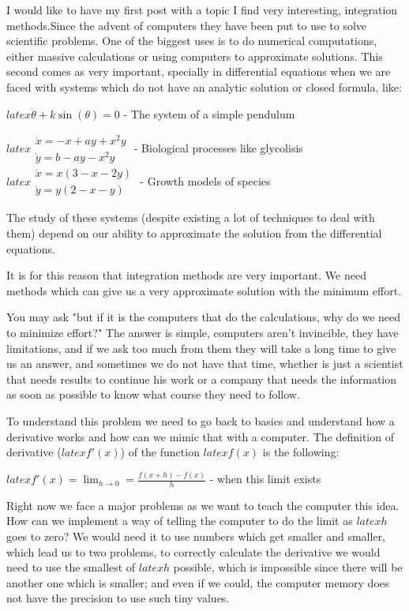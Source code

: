 I would like to have my first post with a topic I find very interesting, integration methods.Since the advent of computers they have been put to use to solve scientific problems. One of the biggest uses is to do numerical computations, either massive calculations or using computers to approximate solutions. This second comes as very important, specially in differential equations when we are faced with systems which do not have an analytic solution or closed formula, like:

    $latex \ddot \theta + k\sin(\theta) = 0$ - The system of a simple pendulum

    $latex \begin{array} {l} \dot x = -x + ay + x^2y\\ \dot y = b -ay - x^2y \end{array}$ - Biological processes like glycolisis
    $latex \begin{array} {l} \dot x = x(3-x-2y)\\ \dot y = y(2-x-y) \end{array}$ - Growth models of species

The study of these systems (despite existing a lot of techniques to deal with them) depend on our ability to approximate the solution from the differential equations.

It is for this reason that integration methods are very important. We need methods which can give us a very approximate solution with the minimum effort.

You may ask "but if it is the computers that do the calculations, why do we need to minimize effort?" The answer is simple, computers aren't invincible, they have limitations, and if we ask too much from them they will take a long time to give us an answer, and sometimes we do not have that time, whether is just a scientist that needs results to continue his work or a company that needs the information as soon as possible to know what course they need to follow.


To understand this problem we need to go back to basics and understand how a derivative works and how can we mimic that with a computer. The definition of derivative ($latex f'(x)$) of the function $latex f(x)$ is the following:

$latex f'(x) = \lim_{h\to 0} = \frac{f(x+h) - f(x)}{h}$ - when this limit exists

Right now we face a major problems as we want to teach the computer this idea. How can we implement a way of telling the computer to do the limit as $latex h$ goes to zero? We would need it to use numbers which get smaller and smaller, which lead us to two problems, to correctly calculate the derivative we would need to use the smallest of $latex h$ possible, which is impossible since there will be another one which is smaller; and even if we could, the computer memory does not have the precision to use such tiny values.

